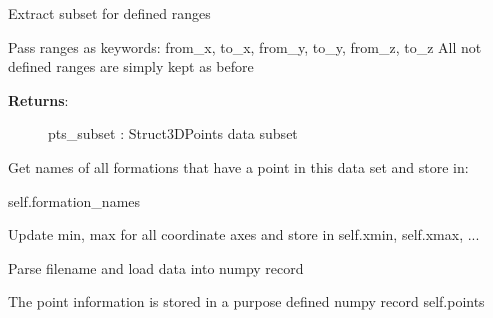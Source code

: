 \documentclass[letterpaper,10pt,english]{sphinxmanual}
\begin{document}
\begin{fulllineitems}
\begin{fulllineitems}
\label{pygeomod:pygeomod.struct_data.Struct3DPoints.extract_range}
Extract subset for defined ranges

Pass ranges as keywords: from\_x, to\_x, from\_y, to\_y, from\_z, to\_z
All not defined ranges are simply kept as before
\begin{description}
\item[{\textbf{Returns}:}] \leavevmode
pts\_subset : Struct3DPoints data subset

\end{description}

\end{fulllineitems}


\begin{fulllineitems}
\label{pygeomod:pygeomod.struct_data.Struct3DPoints.get_formation_names}
Get names of all formations that have a point in this data set
and store in:

self.formation\_names

\end{fulllineitems}


\begin{fulllineitems}
\label{pygeomod:pygeomod.struct_data.Struct3DPoints.get_range}
Update min, max for all coordinate axes and store in
self.xmin, self.xmax, ...

\end{fulllineitems}


\begin{fulllineitems}
\label{pygeomod:pygeomod.struct_data.Struct3DPoints.parse}
Parse filename and load data into numpy record

The point information is stored in a purpose defined numpy record
self.points

\end{fulllineitems}



\end{fulllineitems}
\end{document}
